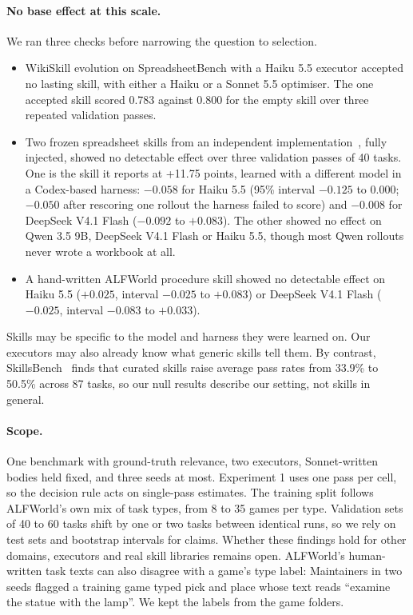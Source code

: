 \documentclass[11pt]{article}
\begin{document}
\paragraph{No base effect at this scale.} We ran three checks before narrowing the question to selection.
\begin{itemize}
\item WikiSkill evolution on SpreadsheetBench with a Haiku 5.5 executor accepted no lasting skill, with either a Haiku or a Sonnet 5.5 optimiser. The one accepted skill scored 0.783 against 0.800 for the empty skill over three repeated validation passes.
\item Two frozen spreadsheet skills from an independent implementation~\cite{stahlg2026wikiskill}, fully injected, showed no detectable effect over three validation passes of 40 tasks. One is the skill it reports at +11.75 points, learned with a different model in a Codex-based harness: $-0.058$ for Haiku 5.5 (95\% interval $-0.125$ to 0.000; $-0.050$ after rescoring one rollout the harness failed to score) and $-0.008$ for DeepSeek V4.1 Flash ($-0.092$ to $+0.083$). The other showed no effect on Qwen 3.5 9B, DeepSeek V4.1 Flash or Haiku 5.5, though most Qwen rollouts never wrote a workbook at all.
\item A hand-written ALFWorld procedure skill showed no detectable effect on Haiku 5.5 ($+0.025$, interval $-0.025$ to $+0.083$) or DeepSeek V4.1 Flash ($-0.025$, interval $-0.083$ to $+0.033$).
\end{itemize}
Skills may be specific to the model and harness they were learned on. Our executors may also already know what generic skills tell them. By contrast, SkillsBench~\cite{li2026skillsbench} finds that curated skills raise average pass rates from 33.9\% to 50.5\% across 87 tasks, so our null results describe our setting, not skills in general.

\paragraph{Scope.} One benchmark with ground-truth relevance, two executors, Sonnet-written bodies held fixed, and three seeds at most. Experiment 1 uses one pass per cell, so the decision rule acts on single-pass estimates. The training split follows ALFWorld's own mix of task types, from 8 to 35 games per type. Validation sets of 40 to 60 tasks shift by one or two tasks between identical runs, so we rely on test sets and bootstrap intervals for claims. Whether these findings hold for other domains, executors and real skill libraries remains open. ALFWorld's human-written task texts can also disagree with a game's type label: Maintainers in two seeds flagged a training game typed pick and place whose text reads ``examine the statue with the lamp''. We kept the labels from the game folders.
\end{document}
